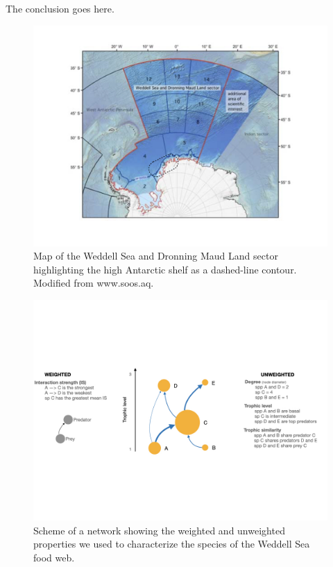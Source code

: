 \documentclass[gc, manuscript]{copernicus}
\begin{document}
The conclusion goes here.

\clearpage

\begin{figure}
\includegraphics[width=12cm]{WeddellSea_map} \caption{Map of the Weddell Sea and Dronning Maud Land sector highlighting the high Antarctic shelf as a dashed-line contour. Modified from www.soos.aq.}\label{fig:unnamed-chunk-1}
\end{figure}

\clearpage

\begin{figure}
\includegraphics[width=12cm]{ToyFoodWeb} \caption{Scheme of a network showing the weighted and unweighted properties we used to characterize the species of the Weddell Sea food web.}\label{fig:unnamed-chunk-2}
\end{figure}

\clearpage
\end{document}
